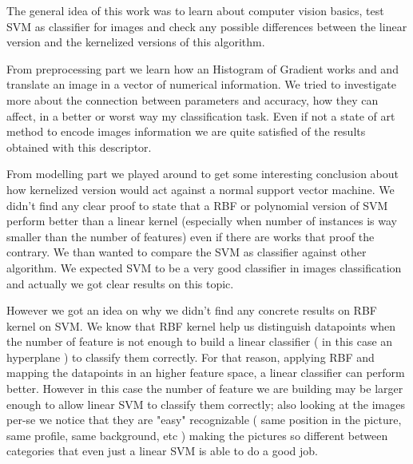 The general idea of this work was to learn about computer vision basics, test SVM as classifier for images and check any possible differences between the linear version and the kernelized versions of this algorithm.

From preprocessing part we learn how an Histogram of Gradient works and and translate an image in a vector of numerical information. We tried to investigate more about the connection between parameters and accuracy, how they can affect, in a better or worst way my classification task. Even if not a state of art method to encode images information we are quite satisfied of the results obtained with this descriptor.

From modelling part we played around to get some interesting conclusion about how kernelized version would act against a normal support vector machine. We didn't find any clear proof to state that a RBF or polynomial version of SVM perform better than a linear kernel (especially when number of instances is way smaller than the number of features) even if there are works that proof the contrary.\cite{hsu2003practical}
We than wanted to compare the SVM as classifier against other algorithm. We expected SVM to be a very good classifier in images classification and actually we got clear results on this topic. 

However we got an idea on why we didn't find any concrete results on RBF kernel on SVM. We know that RBF kernel help us distinguish datapoints when the number of feature is not enough to build a linear classifier ( in this case an hyperplane ) to classify them correctly. For that reason, applying RBF and mapping the datapoints in an higher feature space, a linear classifier can perform better. However in this case the number of feature we are building may be larger enough to allow linear SVM to classify them correctly; also looking at the images per-se we notice that they are "easy" recognizable ( same position in the picture, same profile, same background, etc ) making the pictures so different between categories that even just a linear SVM is able to do a good job.